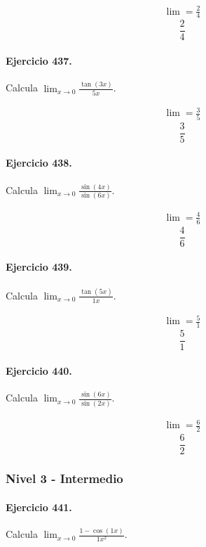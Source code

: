 \documentclass[11pt,a4paper]{article}
\begin{document}
\[
\begin{aligned}
\lim=\frac{2}{4}
\end{aligned}
\]
\[\boxed{\frac{2}{4}}\]


\paragraph{Ejercicio 437.} Calcula $\displaystyle\lim_{x\to0}\frac{\tan(3x)}{5x}$.

\[
\begin{aligned}
\lim=\frac{3}{5}
\end{aligned}
\]
\[\boxed{\frac{3}{5}}\]


\paragraph{Ejercicio 438.} Calcula $\displaystyle\lim_{x\to0}\frac{\sin(4x)}{\sin(6x)}$.

\[
\begin{aligned}
\lim=\frac{4}{6}
\end{aligned}
\]
\[\boxed{\frac{4}{6}}\]


\paragraph{Ejercicio 439.} Calcula $\displaystyle\lim_{x\to0}\frac{\tan(5x)}{1x}$.

\[
\begin{aligned}
\lim=\frac{5}{1}
\end{aligned}
\]
\[\boxed{\frac{5}{1}}\]


\paragraph{Ejercicio 440.} Calcula $\displaystyle\lim_{x\to0}\frac{\sin(6x)}{\sin(2x)}$.

\[
\begin{aligned}
\lim=\frac{6}{2}
\end{aligned}
\]
\[\boxed{\frac{6}{2}}\]


\newpage

\subsubsection*{Nivel 3 - Intermedio}

\paragraph{Ejercicio 441.} Calcula $\displaystyle\lim_{x\to0}\frac{1-\cos(1x)}{1x^2}$.
\end{document}
